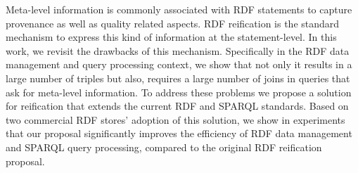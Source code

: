 Meta-level information is commonly associated with RDF statements to capture provenance as well as quality related aspects. RDF reification is the standard mechanism to express this kind of information at the statement-level. In this work, we revisit the drawbacks of this mechanism. Specifically in the RDF data management and query processing context, we show that not only it results in a large number of triples but also, requires a large number of joins in queries that ask for meta-level information. To address these problems we propose a solution for reification that extends the current RDF and SPARQL standards. Based on two commercial RDF stores' adoption of this solution, we show in experiments that our proposal significantly improves the efficiency of RDF data management and SPARQL query processing, compared to the original RDF reification proposal.